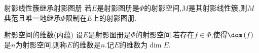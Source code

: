 \begin{theorem}{射影线性簇继承射影图册}{}
	若$E$是射影图册是$\Phi$的射影空间,$M$是其射影线性簇,则$M$典范且唯一地继承$\Phi$限制在$E$上的射影图册.
\end{theorem}

\begin{definition}{射影空间的维数(内蕴)}{}
	设$E$是射影图册是$\Phi$的射影空间.若存在$f\in\Phi$,使得$\dom\left(f\right)$是$n$为射影空间,则称$E$的维数是$n$.记$E$的维数为$\dim E$.
\end{definition}

























